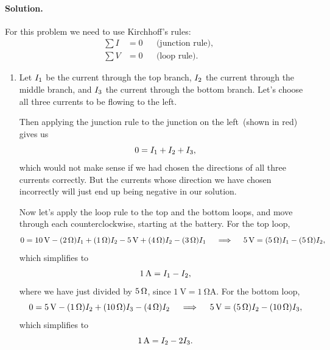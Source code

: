 \documentclass[11pt]{article}
\newcommand{\beq}{\begin{equation*}}
\newcommand{\eeq}{\end{equation*}}
\newcommand{\beqn}{\begin{equation}}
\newcommand{\eeqn}{\end{equation}}
\newenvironment{solution}
{
    \paragraph{Solution.}
    \ignorespaces
}
{
    \bigskip
}
\begin{document}
\begin{solution}
 	For this problem we need to use Kirchhoff's rules:
	\begin{align}
		\sum I &= 0 & &\text{(junction rule)}, \tag{26.5} \label{26.5} \\
		\sum V &= 0 & &\text{(loop rule)}. \tag{26.6} \label{26.6}
	\end{align}
	
	\begin{enumerate}
		\item Let $I_1$ be the current through the top branch, $I_2$ the current through the middle branch, and $I_3$ the current through the bottom branch.  Let's choose all three currents to be flowing to the left.
		
		\vspace{3in}
		
		
		Then applying the junction rule to the junction on the left~(shown in red) gives us
		\beqn \label{junction}
			0 = \Iq + \Iw + \Ie,
		\eeqn
		which would not make sense if we had chosen the directions of all three currents correctly.  But the currents whose direction we have chosen incorrectly will just end up being negative in our solution.
		
		
		Now let's apply the loop rule to the top and the bottom loops, and move through each counterclockwise, starting at the battery.  For the top loop,
		\beq
			0 = \Svolt{10} - (\Sohm{2}) \Iq + (\Sohm{1}) \Iw - \Svolt{5} + (\Sohm{4}) \Iw - (\Sohm{3}) \Iq
			\qimplies
			\Svolt{5} = (\Sohm{5}) \Iq - (\Sohm{5}) \Iw,
		\eeq
		which simplifies to
		\beqn \label{top}
			\Samp{1} = \Iq - \Iw,
		\eeqn
		where we have just divided by $\SI{5}{\ohm}$, since $\SI{1}{\volt} = \SI{1}{\ohm\ampere}$.  For the bottom loop,
		\beq
			0 = \Svolt{5} - (\Sohm{1}) \Iw + (\Sohm{10}) \Ie - (\Sohm{4}) \Iw
			\qimplies
			\Svolt{5} = (\Sohm{5}) \Iw - (\Sohm{10}) \Ie,
		\eeq
		which simplifies to
		\beqn \label{bottom}
			\Samp{1} = \Iw - 2 \Ie.
		\eeqn
		

\end{enumerate}
\end{solution}
\end{document}
